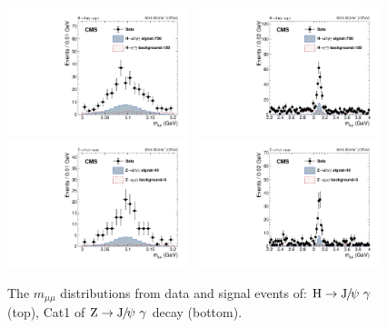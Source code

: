 		\begin{figure}[p]
		  \centering
		  \includegraphics[width=0.47\textwidth]{Fig/Final_NoPreliminary/HJpsiG/Mmumu_JpsiRange_alterBin_Inclusive}~
		  \includegraphics[width=0.47\textwidth]{Fig/Final_NoPreliminary/HJpsiG/Mmumu_JpsiRange_WideRange_Inclusive}\\
		  \includegraphics[width=0.47\textwidth]{Fig/Final_NoPreliminary/ZJpsiG/Mmumu_JpsiRange_alterBin_EBHR9}~
		  \includegraphics[width=0.47\textwidth]{Fig/Final_NoPreliminary/ZJpsiG/Mmumu_JpsiRange_WideRange_EBHR9}\\
		  \caption{The $m_{\mu\mu}$ distributions from data and signal events of: $\mathrm{H}\to{\mathrm{J}\hspace{-.08em}/\hspace{-.14em}\psi}\ \gamma$ (top), Cat1 of $\mathrm{Z}\to{\mathrm{J}\hspace{-.08em}/\hspace{-.14em}\psi}\ \gamma$ decay (bottom). \label{fig:dist-2a}}
		\end{figure}

